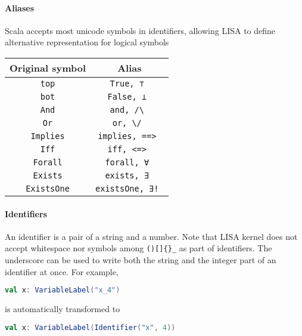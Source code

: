 \paragraph{Aliases}
Scala accepts most unicode symbols in identifiers, allowing LISA to define alternative representation for logical symbols
\begin{center}
  \begin{tabular}{| c | c |}

    \hline
    Original symbol       & Alias                      \\
    \hline

    \lstinline|top|       & \lstinline|True, ⊤ |       \\ \hline
    \lstinline|bot|       & \lstinline|False, ⊥ |      \\ \hline
    \lstinline|And|       & \lstinline|and, /\ |       \\ \hline
    \lstinline|Or|        & \lstinline|or, \/ |        \\ \hline
    \lstinline|Implies|   & \lstinline|implies, ==> |  \\ \hline
    \lstinline|Iff|       & \lstinline|iff, <=> |      \\ \hline
    \lstinline|Forall|    & \lstinline|forall, ∀ |     \\ \hline
    \lstinline|Exists|    & \lstinline|exists, ∃ |     \\ \hline
    \lstinline|ExistsOne| & \lstinline|existsOne, ∃! | \\ \hline
  \end{tabular}
\end{center}
\paragraph{Identifiers}
An identifier is a pair of a string and a number. Note that LISA kernel does not accept whitespace nor symbols among \lstinline|()[]{}_| as part of identifiers. The underscore can be used to write both the string and the integer part of an identifier at once. For example,

\begin{lstlisting}[language=Scala]
  val x: VariableLabel("x_4")
\end{lstlisting}

is automatically transformed to

\begin{lstlisting}[language=Scala]
  val x: VariableLabel(Identifier("x", 4))
\end{lstlisting}

